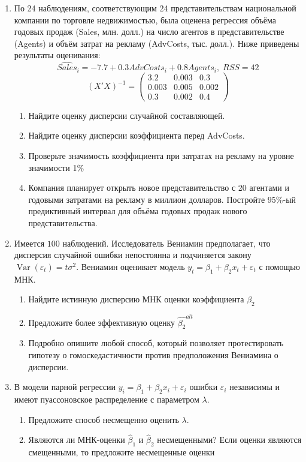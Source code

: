\documentclass[12pt,a4paper]{article}
\DeclareMathOperator{\Var}{Var}
\newcommand{\hb}{\hat{\beta}}
\newcommand{\e}{\varepsilon}
\begin{document}
\begin{enumerate}
\item По 24 наблюдениям, соответствующим 24 представительствам национальной компании по торговле недвижимостью, была оценена регрессия объёма годовых продаж (Sales, млн. долл.) на число агентов в представительстве (Agents) и объём затрат на рекламу (AdvCosts, тыс. долл.).
Ниже приведены результаты оценивания:
\[
\widehat{Sales}_i = -7.7 + 0.3 AdvCosts_i + 0.8Agents_i,  \; RSS=42
\]
\[
(X'X)^{-1}=\begin{pmatrix}
3.2 & 0.003 & 0.3 \\
0.003& 0.005 & 0.002 \\
0.3 & 0.002 & 0.4
\end{pmatrix}
\]
\begin{enumerate}
\item Найдите оценку дисперсии случайной составляющей.
\item  Найдите оценку дисперсии коэффициента перед AdvCosts.
\item  Проверьте значимость коэффициента при затратах на рекламу на уровне значимости 1\%
\item Компания планирует открыть новое представительство с 20 агентами и годовыми затратами на рекламу в миллион долларов. Постройте 95\%-ый предиктивный интервал для объёма годовых продаж нового представительства.
\end{enumerate}

\item Имеется $100$ наблюдений. Исследователь Вениамин предполагает, что дисперсия случайной ошибки непостоянна и подчиняется закону $\Var(\e_t)=t\sigma^2$. Вениамин оценивает модель $y_t=\beta_1 + \beta_2 x_t +\varepsilon_t$ с помощью МНК.
\begin{enumerate}
\item Найдите истинную дисперсию МНК оценки коэффициента $\beta_2$
\item Предложите более эффективную оценку $\hat{\beta_2}^{alt}$
\item Подробно опишите любой способ, который позволяет протестировать гипотезу о гомоскедастичности против предположения Вениамина о дисперсии.
\end{enumerate}
\newpage

\item В модели парной регрессии $y_i=\beta_1+\beta_2 x_i +\e_i$ ошибки $\e_i$ независимы и имеют пуассоновское распределение с параметром $\lambda$.
\begin{enumerate}
\item Предложите способ несмещенно оценить $\lambda$.
\item Являются ли МНК-оценки $\hb_1$ и $\hb_2$ несмещенными? Если оценки являются смещенными, то предложите несмещенные оценки
\end{enumerate}



\end{enumerate}
\end{document}
